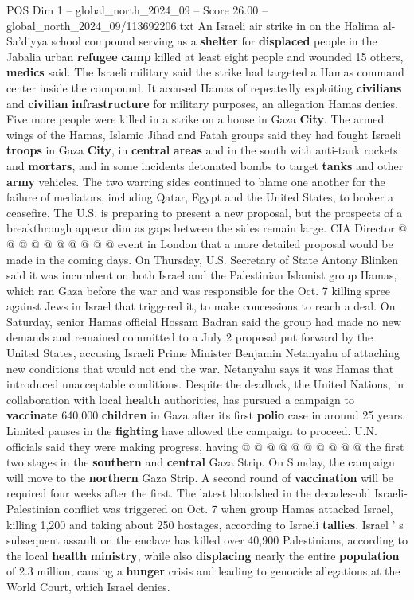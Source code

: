 \begin{textsample}{POS Dim 1 – global\_north\_2024\_09 – Score 26.00 – global\_north\_2024\_09/113692206.txt}  \label{ex:f1_pos_424}
An Israeli air strike in on the Halima al-Sa'diyya school compound serving as a \textbf{shelter} for \textbf{displaced} people in the Jabalia urban \textbf{refugee} \textbf{camp} killed at least eight people and wounded 15 others, \textbf{medics} said.
The Israeli military said the strike had targeted a Hamas command center inside the compound.
It accused Hamas of repeatedly exploiting \textbf{civilians} and \textbf{civilian} \textbf{infrastructure} for military purposes, an allegation Hamas denies.
Five more people were killed in a strike on a house in Gaza \textbf{City}.
The armed wings of the Hamas, Islamic Jihad and Fatah groups said they had fought Israeli \textbf{troops} in Gaza \textbf{City}, in \textbf{central} \textbf{areas} and in the south with anti-tank rockets and \textbf{mortars}, and in some incidents detonated bombs to target \textbf{tanks} and other \textbf{army} vehicles.
The two warring sides continued to blame one another for the failure of mediators, including Qatar, Egypt and the United States, to broker a ceasefire.
The U.S. is preparing to present a new proposal, but the prospects of a breakthrough appear dim as gaps between the sides remain large.
CIA Director @ @ @ @ @ @ @ @ @ @ event in London that a more detailed proposal would be made in the coming days.
On Thursday, U.S.
Secretary of State Antony Blinken said it was incumbent on both Israel and the Palestinian Islamist group Hamas, which ran Gaza before the war and was responsible for the Oct. 7 killing spree against Jews in Israel that triggered it, to make concessions to reach a deal.
On Saturday, senior Hamas official Hossam Badran said the group had made no new demands and remained committed to a July 2 proposal put forward by the United States, accusing Israeli Prime Minister Benjamin Netanyahu of attaching new conditions that would not end the war.
Netanyahu says it was Hamas that introduced unacceptable conditions.
Despite the deadlock, the United Nations, in collaboration with local \textbf{health} authorities, has pursued a campaign to \textbf{vaccinate} 640,000 \textbf{children} in Gaza after its first \textbf{polio} case in around 25 years.
Limited pauses in the \textbf{fighting} have allowed the campaign to proceed.
U.N. officials said they were making progress, having @ @ @ @ @ @ @ @ @ @ the first two stages in the \textbf{southern} and \textbf{central} Gaza Strip.
On Sunday, the campaign will move to the \textbf{northern} Gaza Strip.
A second round of \textbf{vaccination} will be required four weeks after the first.
The latest bloodshed in the decades-old Israeli-Palestinian conflict was triggered on Oct. 7 when group Hamas attacked Israel, killing 1,200 and taking about 250 hostages, according to Israeli \textbf{tallies}.
Israel ' s subsequent assault on the enclave has killed over 40,900 Palestinians, according to the local \textbf{health} \textbf{ministry}, while also \textbf{displacing} nearly the entire \textbf{population} of 2.3 million, causing a \textbf{hunger} crisis and leading to genocide allegations at the World Court, which Israel denies.


\end{textsample}
